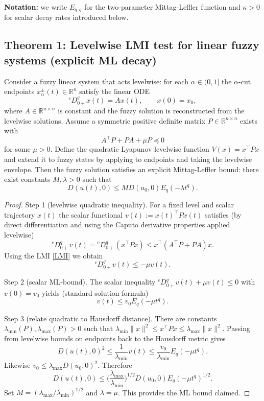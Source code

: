 \documentclass[11pt,a4paper]{article}
\theoremstyle{plain}
\theoremstyle{definition}
\theoremstyle{remark}
\newcommand{\Haus}{D}
\begin{document}
	\vspace{6pt}
	\noindent\textbf{Notation:} we write \(E_{q,q}\) for the two-parameter Mittag-Leffler function and \(\kappa>0\) for scalar decay rates introduced below.
	
	\subsection{Theorem 1: Levelwise LMI test for linear fuzzy systems (explicit ML decay)}
	
	Consider a fuzzy linear system that acts levelwise: for each \(\alpha\in(0,1]\) the \(\alpha\)-cut endpoints \(x_\alpha^\pm(t)\in\mathbb{R}^n\) satisfy the linear ODE
	\[
	{}^cD_{0+}^q x(t)=A x(t),\qquad x(0)=x_0,
	\]
	where \(A\in\mathbb{R}^{n\times n}\) is constant and the fuzzy solution is reconstructed from the levelwise solutions. Assume a symmetric positive definite matrix \(P\in\mathbb{R}^{n\times n}\) exists with
	\begin{equation}\label{LMI}
		A^\top P + P A + \mu P \preceq 0
	\end{equation}
	for some \(\mu>0\). Define the quadratic Lyapunov levelwise function \(V(x)=x^\top P x\) and extend it to fuzzy states by applying to endpoints and taking the levelwise envelope. Then the fuzzy solution satisfies an explicit Mittag-Leffler bound: there exist constants \(M,\lambda>0\) such that
	\[
	\Haus(u(t),0)\le M\Haus(u_0,0)E_q(-\lambda t^q).
	\]
	
	\begin{proof}
		Step 1 (levelwise quadratic inequality). For a fixed level and scalar trajectory \(x(t)\) the scalar functional \(v(t):=x(t)^\top P x(t)\) satisfies (by direct differentiation and using the Caputo derivative properties applied levelwise)
		\[
		{}^cD_{0+}^q v(t) = {}^cD_{0+}^q(x^\top P x) \le x^\top (A^\top P + P A) x.
		\]
		Using the LMI \eqref{LMI} we obtain
		\[
		{}^cD_{0+}^q v(t) \le -\mu v(t).
		\]
		
		Step 2 (scalar ML-bound). The scalar inequality \({}^cD_{0+}^q v(t) + \mu v(t)\le0\) with \(v(0)=v_0\) yields (standard solution formula)
		\[
		v(t)\le v_0 E_q(-\mu t^q).
		\]
		
		Step 3 (relate quadratic to Hausdorff distance). There are constants \(\lambda_{\min}(P),\lambda_{\max}(P)>0\) such that \(\lambda_{\min}\|x\|^2\le x^\top P x\le \lambda_{\max}\|x\|^2\). Passing from levelwise bounds on endpoints back to the Hausdorff metric gives
		\[
		\Haus(u(t),0)^2 \le \frac{1}{\lambda_{\min}} v(t) \le \frac{v_0}{\lambda_{\min}}E_q(-\mu t^q).
		\]
		Likewise \(v_0\le \lambda_{\max}\Haus(u_0,0)^2\). Therefore
		\[
		\Haus(u(t),0) \le \Big(\frac{\lambda_{\max}}{\lambda_{\min}}\Big)^{1/2}\Haus(u_0,0) E_q(-\mu t^q)^{1/2}.
		\]
		Set \(M=(\lambda_{\max}/\lambda_{\min})^{1/2}\) and \(\lambda=\mu\). This provides the ML bound claimed.
	\end{proof}
	
\end{document}
